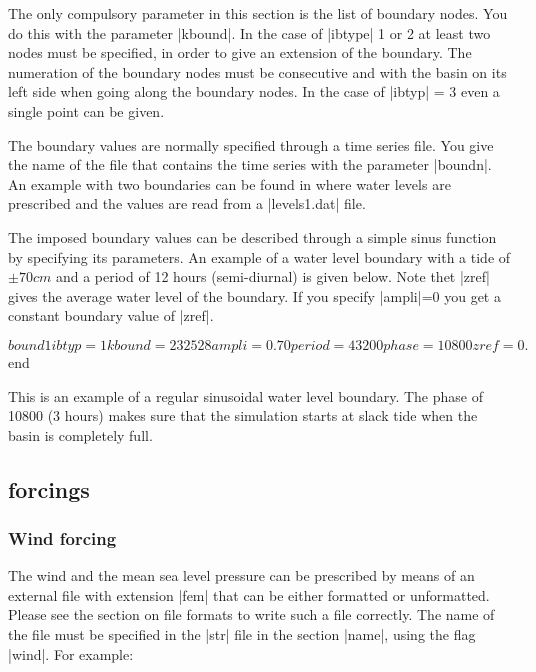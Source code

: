 The only compulsory parameter in this section is the list of boundary
nodes.  You do this with the parameter |kbound|. 
In the case of |ibtype| 1 or 2 at least two nodes must be
specified, in order to give an extension of the boundary. The numeration
of the boundary nodes must be consecutive and with the basin on its
left side when going along the boundary nodes.  In the case of |ibtyp|
= 3 even a single point can be given.

The boundary values are normally specified through a time series file. 
You give the name of the file that contains
the time series with the parameter |boundn|. 
An example with two boundaries can be found
 in \Fig{} where water levels are prescribed and 
the values are read from a |levels1.dat| file.

The imposed boundary values can be described through a simple sinus function by specifying  its parameters.
 An example of a water level boundary with a tide of
$\pm 70 cm$ and a period of 12 hours (semi-diurnal) is given below. Note thet |zref| gives the average water level of the
boundary. If you specify |ampli|=0 you get a constant boundary value
of |zref|.

\begin{code}
$bound1
      ibtyp = 1   kbound = 23 25 28
      ampli = 0.70  period = 43200  phase = 10800  zref = 0.
$end
\end{code}
This is an example of a regular sinusoidal water level boundary.
The phase of 10800 (3 hours) makes sure that the simulation starts at
slack tide when the basin is completely full.

\subsection{forcings}

\subsubsection{Wind forcing}
The wind and the mean sea level pressure can be prescribed by means of an external
 file with extension |fem| that can be either formatted or unformatted.
 Please see the section on file formats to write such a
file correctly.  The name of the file must be specified in the |str|
file in the section |name|, using the flag |wind|. For example:

